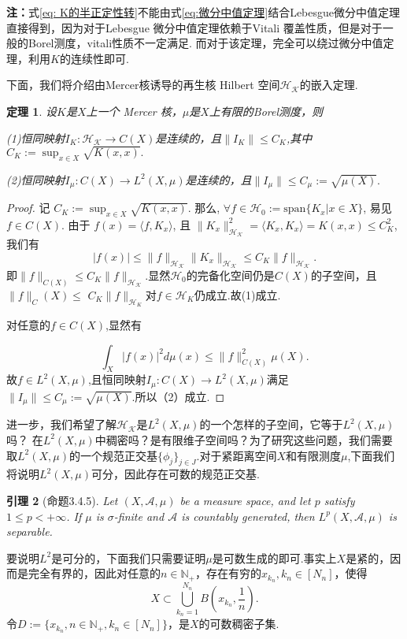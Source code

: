 \documentclass[12pt, a4paper, oneside]{ctexbook}
\newtheorem{theorem}{定理}[section]
\newtheorem{lemma}[theorem]{引理}
\begin{document}
\textbf{注：}式\eqref{eq: K的半正定性转}不能由式\eqref{eq:微分中值定理}结合Lebesgue微分中值定理直接得到，因为对于Lebesgue 微分中值定理依赖于Vitali 覆盖性质，但是对于一般的Borel测度，vitali性质不一定满足. 而对于该定理，完全可以绕过微分中值定理，利用$K$的连续性即可.

下面，我们将介绍由Mercer核诱导的再生核 Hilbert 空间$\mathcal{H_K}$的嵌入定理.
\begin{theorem}
    设$K$是$X$上一个 Mercer 核，$\mu$是$X$上有限的Borel测度，则
    
(1)恒同映射$I_K:\mathcal{H_K}\to C(X)$是连续的，且$\|I_K\|\leq C_K$,其中$C_K:=\sup_{x\in X}\sqrt{K(x,x)}.$

(2)恒同映射$I_\mu:C(X)\to L^2(X,\mu)$是连续的，且$\|I_\mu\|\leq C_\mu:=\sqrt{\mu(X)}.$
\end{theorem}

\begin{proof}
    记 $C_K := \sup_{x \in X} \sqrt{K(x, x)}$. 那么, $\forall f \in \mathcal{H}_0 := \text{span}\{K_x | x \in X\}$, 易见 $f \in C(X)$. 由于 $f(x) = \langle f, K_x  \rangle$, 且 $\|K_x\|_{\mathcal{H_K}}^2 = \langle K_x, K_x \rangle = K(x, x) \leq C_K^2$, 我们有
$$|f(x)| \leq \|f\|_{\mathcal{H_K}} \|K_x\|_{\mathcal{H_K}} \leq C_K \|f\|_{\mathcal{H_K}}.$$
即$\|f\|_{C(X)}\leq C_K\|f\|_{\mathcal{H_K}}$.显然$\mathcal{H}_0$的完备化空间仍是$C(X)$的子空间，且$\|f\|_C(X)\leq$
$C_{K}\|f\|_{\mathcal{H}_{K}}$对$f\in\mathcal{H}_{K}$仍成立.故(1)成立.

对任意的$f\in C(X)$,显然有

$$\int_X|f(x)|^2d\mu(x)\leq\|f\|_{C(X)}^2\mu(X).$$
故$f\in L^2(X,\mu)$,且恒同映射$I_\mu:C(X)\to L^2(X,\mu)$满足$\|I_\mu\|\leq C_\mu:=\sqrt{\mu(X)}$.所以（2）成立.
\end{proof}


进一步，我们希望了解$\mathcal{H_K}$是$L^2(X,\mu)$的一个怎样的子空间，它等于$L^2(X,\mu)$吗？ 在$L^2(X,\mu)$中稠密吗？是有限维子空间吗？为了研究这些问题，我们需要取$L^2(X,\mu)$的一个规范正交基$\{\phi_j\}_{j\in J}$.对于紧距离空间$X$和有限测度$\mu$,下面我们将说明$L^2(X,\mu)$可分，因此存在可数的规范正交基.

\begin{lemma}[\cite{Cohn2013MeasureTheory2}命题3.4.5]
    Let $(X,\mathcal{A},\mu)$ be a measure space, and let $p$ satisfy $1 \leq p < +\infty$. If $\mu$ is $\sigma$-finite and $\mathcal{A}$ is countably generated, 
then $L^p(X,\mathcal{A},\mu)$ is separable.
\end{lemma}

要说明$L^2$是可分的，下面我们只需要证明$\mu$是可数生成的即可.事实上$X$是紧的，因而是完全有界的，因此对任意的$n\in \mathbb{N}_+$，存在有穷的$x_{k_n},k_n\in [N_n]$，使得
\begin{equation*}
    X\subset \bigcup_{k_n=1}^{N_n} B(x_{k_n},\frac 1n).
\end{equation*}
令$D:=\{x_{k_n},n\in \mathbb{N}_+,k_n\in[N_n]\}$，是$X$的可数稠密子集.
\end{document}
